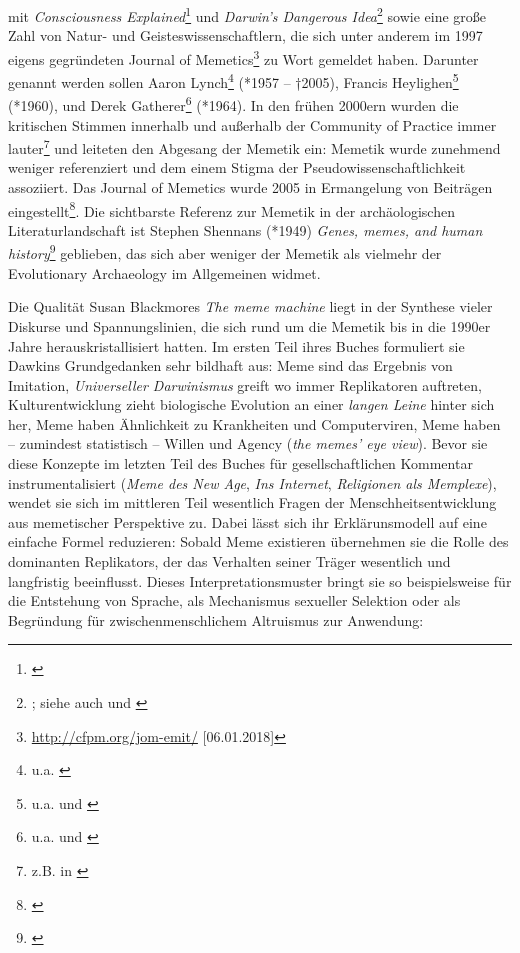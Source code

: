 \documentclass[openany,twoside,twocolumn]{book}
\let\rmarkdownfootnote\footnote%
\def\footnote{\protect\rmarkdownfootnote}
\begin{document}
mit \emph{Consciousness Explained}\footnote{\textcite{dennett_consciousness_1991}}
und \emph{Darwin's Dangerous Idea}\footnote{\textcite{dennett_darwins_1995};
  siehe auch \textcite{dennett_brainstorms_1978} und
  \textcite{dennett_elbow_1984}} sowie eine große Zahl von Natur- und
Geisteswissenschaftlern, die sich unter anderem im 1997 eigens
gegründeten Journal of Memetics\footnote{\url{http://cfpm.org/jom-emit/}
  {[}06.01.2018{]}} zu Wort gemeldet haben. Darunter genannt werden
sollen Aaron Lynch\footnote{u.a. \textcite{lynch_thought_1996}} (*1957
-- †2005), Francis Heylighen\footnote{u.a.
  \textcite{heylighen_evolution_1996} und
  \textcite{heylighen_selfish_1992}} (*1960), und Derek
Gatherer\footnote{u.a. \textcite{gatherer_identifying_2002} und
  \textcite{gatherer_spread_2002}} (*1964). In den frühen 2000ern wurden
die kritischen Stimmen innerhalb und außerhalb der Community of Practice
immer lauter\footnote{z.B. in \textcite{aunger_darwinizing_2000}} und
leiteten den Abgesang der Memetik ein: Memetik wurde zunehmend weniger
referenziert und dem einem Stigma der Pseudowissenschaftlichkeit
assoziiert. Das Journal of Memetics wurde 2005 in Ermangelung von
Beiträgen eingestellt\footnote{\textcite{vada_what_2015}}. Die
sichtbarste Referenz zur Memetik in der archäologischen
Literaturlandschaft ist Stephen Shennans (*1949) \emph{Genes, memes, and
human history}\footnote{\textcite{shennan_genes_2002}} geblieben, das
sich aber weniger der Memetik als vielmehr der Evolutionary Archaeology
im Allgemeinen widmet.

Die Qualität Susan Blackmores \emph{The meme machine} liegt in der
Synthese vieler Diskurse und Spannungslinien, die sich rund um die
Memetik bis in die 1990er Jahre herauskristallisiert hatten. Im ersten
Teil ihres Buches formuliert sie Dawkins Grundgedanken sehr bildhaft
aus: Meme sind das Ergebnis von Imitation, \emph{Universeller
Darwinismus} greift wo immer Replikatoren auftreten, Kulturentwicklung
zieht biologische Evolution an einer \emph{langen Leine} hinter sich
her, Meme haben Ähnlichkeit zu Krankheiten und Computerviren, Meme haben
-- zumindest statistisch -- Willen und Agency (\emph{the memes' eye
view}). Bevor sie diese Konzepte im letzten Teil des Buches für
gesellschaftlichen Kommentar instrumentalisiert (\emph{Meme des New
Age}, \emph{Ins Internet}, \emph{Religionen als Memplexe}), wendet sie
sich im mittleren Teil wesentlich Fragen der Menschheitsentwicklung aus
memetischer Perspektive zu. Dabei lässt sich ihr Erklärunsmodell auf
eine einfache Formel reduzieren: Sobald Meme existieren übernehmen sie
die Rolle des dominanten Replikators, der das Verhalten seiner Träger
wesentlich und langfristig beeinflusst. Dieses Interpretationsmuster
bringt sie so beispielsweise für die Entstehung von Sprache, als
Mechanismus sexueller Selektion oder als Begründung für
zwischenmenschlichem Altruismus zur Anwendung:
\end{document}
